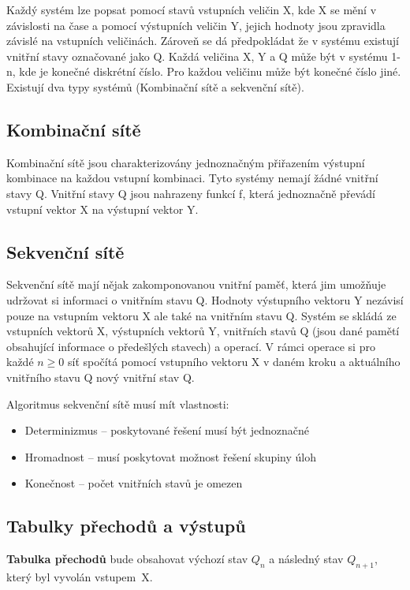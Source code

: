 Každý systém lze popsat pomocí stavů vstupních veličin X, kde X se mění v závislosti na čase a pomocí výstupních veličin Y, jejich hodnoty jsou zpravidla závislé na vstupních veličinách.
Zároveň se dá předpokládat že v systému existují vnitřní stavy označované jako Q.
Každá veličina X, Y a Q může být v systému 1-n, kde je konečné diskrétní číslo.
Pro každou veličinu může být konečné číslo jiné.
Existují dva typy systémů (Kombinační sítě a sekvenční sítě).

\subsection{Kombinační sítě}

Kombinační sítě jsou charakterizovány jednoznačným přiřazením výstupní kombinace na každou vstupní kombinaci.
Tyto systémy nemají žádné vnitřní stavy Q.
Vnitřní stavy Q jsou nahrazeny funkcí f, která jednoznačně převádí vstupní vektor X na výstupní vektor Y.

\subsection{Sekvenční sítě}

Sekvenční sítě mají nějak zakomponovanou vnitřní paměť, která jim umožňuje udržovat si informaci o vnitřním stavu Q.
Hodnoty výstupního vektoru Y nezávisí pouze na vstupním vektoru X ale také na vnitřním stavu Q.
Systém se skládá ze vstupních vektorů X, výstupních vektorů Y, vnitřních stavů Q (jsou dané pamětí obsahující informace o předešlých stavech) a operací.
V rámci operace si pro každé $n\ge0$ síť spočítá pomocí vstupního vektoru X v daném kroku a aktuálního vnitřního stavu Q nový vnitřní stav Q.

Algoritmus sekvenční sítě musí mít vlastnosti:
\begin{itemize}[noitemsep]
    \item Determinizmus -- poskytované řešení musí být jednoznačné
    \item Hromadnost -- musí poskytovat možnost řešení skupiny úloh
    \item Konečnost -- počet vnitřních stavů je omezen
\end{itemize}

\subsection{Tabulky přechodů a výstupů}
\textbf{Tabulka přechodů} bude obsahovat výchozí stav $Q_n$ a následný stav $Q_{n+1}$, který byl vyvolán vstupem~X.

